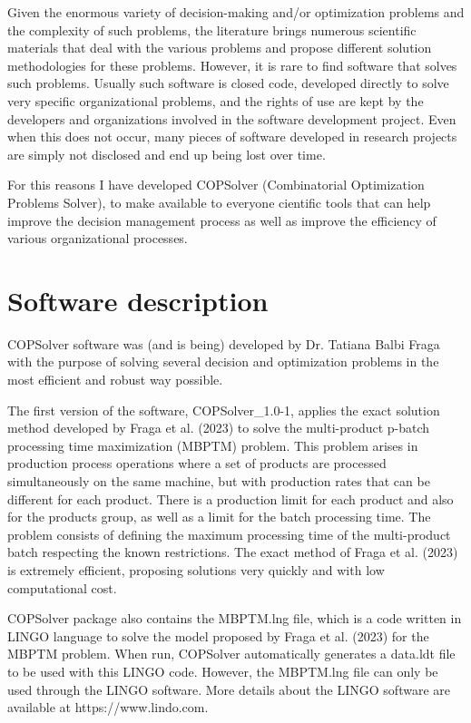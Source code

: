 \documentclass[11pt, letterpaper]{article}
\begin{document}
Given the enormous variety of decision-making and/or optimization problems and the complexity of such problems, the literature brings numerous scientific materials that deal with the various problems and propose different solution methodologies for these problems. However, it is rare to find software that solves such problems. Usually such software is closed code, developed directly to solve very specific organizational problems, and the rights of use are kept by the developers and organizations involved in the software development project. Even when this does not occur, many pieces of software developed in research projects are simply not disclosed and end up being lost over time.

For this reasons I have developed COPSolver (Combinatorial Optimization Problems Solver), to make available to everyone cientific tools that can help improve the decision management process as well as improve the efficiency of various organizational processes.

\section{Software description}

COPSolver software was (and is being) developed by Dr. Tatiana Balbi Fraga with the purpose of solving several decision and optimization problems in the most efficient and robust way possible.

The first version of the software, COPSolver\_1.0-1, applies the exact solution method developed by Fraga et al. (2023) to solve the multi-product p-batch processing time maximization (MBPTM) problem. This problem arises in production process operations where a set of products are processed simultaneously on the same machine, but with production rates that can be different for each product. There is a production limit for each product and also for the products group, as well as a limit for the batch processing time. The problem consists of defining the maximum processing time of the multi-product batch respecting the known restrictions. The exact method of Fraga et al. (2023) is extremely efficient, proposing solutions very quickly and with low computational cost. 

COPSolver package also contains the MBPTM.lng file, which is a code written in LINGO language to solve the model proposed by Fraga et al. (2023) for the MBPTM problem. When run, COPSolver automatically generates a data.ldt file to be used with this LINGO code. However, the MBPTM.lng file can only be used through the LINGO software. More details about the LINGO software are available at https://www.lindo.com.
\end{document}
